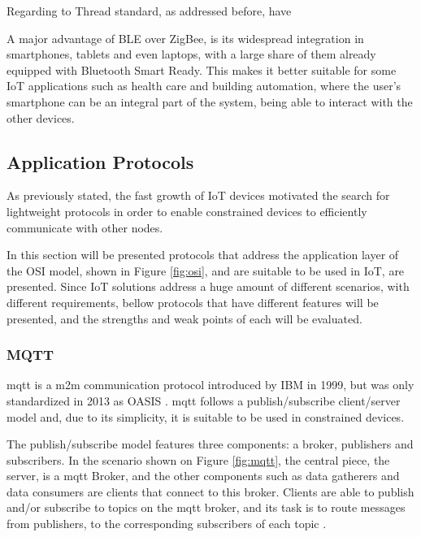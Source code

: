 Regarding to Thread standard, as addressed before, have

A major advantage of BLE over ZigBee, is its widespread integration in smartphones, tablets and even laptops, with a large share of them already equipped with Bluetooth Smart Ready. This makes it better suitable for some IoT applications such as health care and building automation, where the user’s smartphone can be an integral part of the system, being able to interact with the other devices.

\subsection{Application Protocols}

As previously stated, the fast growth of IoT devices motivated the search for lightweight protocols in order to enable constrained devices to efficiently communicate with other nodes.

In this section will be presented protocols that address the application layer of the OSI model, shown in Figure \ref{fig:osi}, and are suitable to be used in IoT, are presented. Since IoT solutions address a huge amount of different scenarios, with different requirements, bellow protocols that have different features will be presented, and the strengths and weak points of each will be evaluated.

\subsubsection{MQTT}

\acf{mqtt} is a \ac{m2m} communication protocol introduced by IBM in 1999, but was only standardized in 2013 as OASIS \cite{Al-fuqaha2015}. \ac{mqtt} follows a publish/subscribe client/server model and, due to its simplicity, it is suitable to be used in constrained devices.

The publish/subscribe model features three components: a broker, publishers and subscribers. In the scenario shown on Figure \ref{fig:mqtt}, the central piece, the server, is a \ac{mqtt} Broker, and the other components such as data gatherers and data consumers are clients that connect to this broker. Clients are able to publish and/or subscribe to topics on the \ac{mqtt} broker, and its task is to route messages from publishers, to the corresponding subscribers of each topic \cite{Al-fuqaha2015}. 

